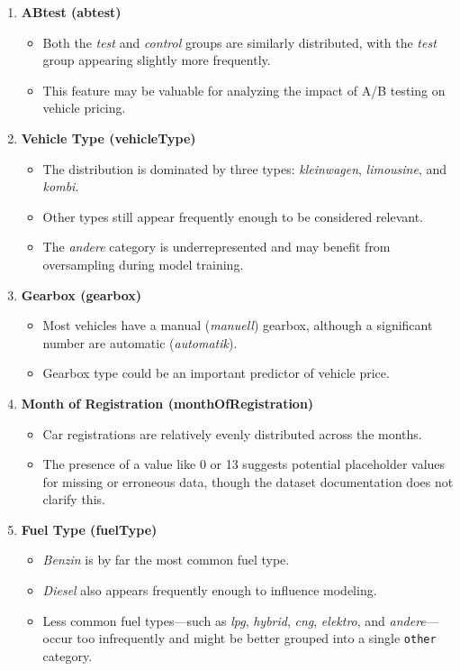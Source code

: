 \documentclass[conference]{IEEEtran}
\begin{document}
\begin{enumerate}
    \item \textbf{ABtest (abtest)}
    \begin{itemize}
        \item Both the \textit{test} and \textit{control} groups are similarly
                distributed, with the \textit{test} group appearing slightly
                more frequently.
        \item This feature may be valuable for analyzing the impact of A/B
                testing on vehicle pricing.
    \end{itemize}
    
    \item \textbf{Vehicle Type (vehicleType)}
    \begin{itemize}
        \item The distribution is dominated by three types:
                \textit{kleinwagen}, \textit{limousine}, and \textit{kombi}.
        \item Other types still appear frequently enough to be considered relevant.
        \item The \textit{andere} category is underrepresented and may benefit
                from oversampling during model training.
    \end{itemize}
    
    \item \textbf{Gearbox (gearbox)}
    \begin{itemize}
        \item Most vehicles have a manual (\textit{manuell}) gearbox, although
                a significant number are automatic (\textit{automatik}).
        \item Gearbox type could be an important predictor of vehicle price.
    \end{itemize}
    
    \item \textbf{Month of Registration (monthOfRegistration)}
    \begin{itemize}
        \item Car registrations are relatively evenly distributed across the months.
        \item The presence of a value like 0 or 13 suggests potential
                placeholder values for missing or erroneous data, though the
                dataset documentation does not clarify this.
    \end{itemize}
    
    \item \textbf{Fuel Type (fuelType)}
    \begin{itemize}
        \item \textit{Benzin} is by far the most common fuel type.
        \item \textit{Diesel} also appears frequently enough to influence modeling.
        \item Less common fuel types—such as \textit{lpg}, \textit{hybrid},
                \textit{cng}, \textit{elektro}, and \textit{andere}—occur too
                infrequently and might be better grouped into a single
                \texttt{other} category.
    \end{itemize}


\end{enumerate}
\end{document}
